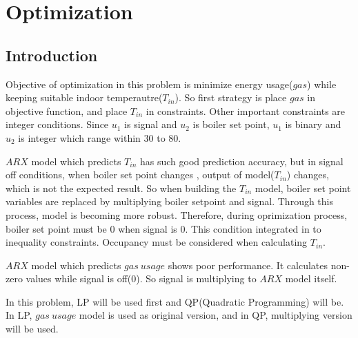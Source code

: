 \documentclass{article}
\begin{document}
\clearpage









\section{Optimization}
\subsection{Introduction}

\hspace{\parindent}Objective of optimization in this problem is minimize energy usage($gas$) while keeping suitable indoor temperautre($T_{in}$). So first strategy is place $gas$ in objective function, and place $T_{in}$ in constraints.
Other important constraints are integer conditions. Since $u_1$ is signal and $u_2$ is boiler set point, $u_1$ is binary and $u_2$ is integer which range within 30 to 80.


$ARX$ model which predicts $T_{in}$ has such good prediction accuracy, but in signal off conditions, when boiler set point changes , output of model($T_{in}$) changes, which is not the expected result. So when building the $T_{in}$ model, boiler set point variables are replaced by multiplying boiler setpoint and signal. Through this process, model is becoming more robust. Therefore, during oprimization process, boiler set point must be 0 when signal is 0. This condition integrated in to inequality constraints. Occupancy must be considered when calculating $T_{in}$.

$ARX$ model which predicts $gas\:usage$ shows poor performance. It calculates non-zero values while signal is off(0). So signal is multiplying to $ARX$ model itself.

In this problem, LP will be used first and QP(Quadratic Programming) will be. In LP, $gas\:usage$ model is used as original version, and in QP, multiplying version will be used.
\end{document}
